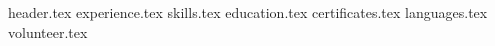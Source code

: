 \documentclass[a4paper,12pt]{article}
\begin{document}

{header.tex}
{experience.tex}
{skills.tex}
{education.tex}
{certificates.tex}
{languages.tex}
{volunteer.tex}
\end{document}
